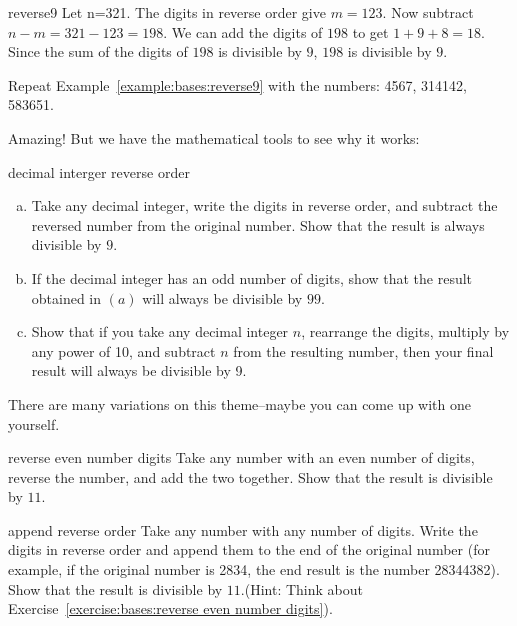 \begin{example}{reverse9}
Let n=321. The digits in reverse order give $m=123$. Now subtract $n-m=321-123=198$. We can add the digits of $198$ to get $1+9+8=18$. Since the sum of the digits of $198$ is divisible by $9$, $198$ is divisible by $9$.
\end{example}

\begin{exercise}{}
Repeat Example~\ref{example:bases:reverse9} with the numbers: 4567, 314142, 583651.
\end{exercise}

Amazing!  But we have the mathematical tools to see why it works:

\begin{exercise}{decimal interger reverse order}
\begin{enumerate}[(a)]
\item Take any decimal integer, write the digits in reverse order, and subtract the reversed number from the original number. Show that the result is always divisible by $9$.\\
\item If the decimal integer has an odd number of digits, show that the result obtained in $(a)$ will always be divisible by $99$.
\item Show that if you take any decimal integer $n$, rearrange the digits, multiply by any power of 10, and  subtract $n$ from the resulting number, then your final result will always be divisible by 9. 
\end{enumerate}
\end{exercise}

There are many variations on this theme--maybe you can come up with one yourself.

\begin{exercise}{reverse even number digits}
Take any number with an even number of digits, reverse the number, and add the two together. Show that the result is divisible by $11$.
\end{exercise}

\begin{exercise}{append reverse order}
Take any number with any number of digits. Write the digits in reverse order and append them to the end of the original number (for example, if the original number is 2834, the end result is the number 28344382). Show that the result is divisible by $11$.(Hint: Think about Exercise~\ref{exercise:bases:reverse even number digits}). 
\end{exercise}

